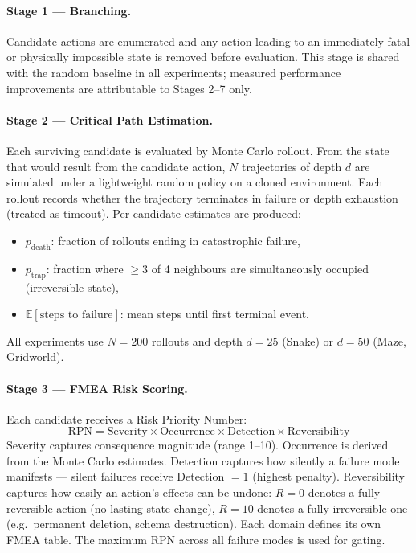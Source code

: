 \documentclass[11pt,letterpaper]{article}
\begin{document}
\paragraph{Stage 1 --- Branching.}
Candidate actions are enumerated and any action leading to an immediately fatal
or physically impossible state is removed before evaluation. This stage is shared
with the random baseline in all experiments; measured performance improvements are
attributable to Stages 2--7 only.

\paragraph{Stage 2 --- Critical Path Estimation.}
Each surviving candidate is evaluated by Monte Carlo rollout. From the state
that would result from the candidate action, $N$ trajectories of depth $d$ are
simulated under a lightweight random policy on a cloned environment. Each
rollout records whether the trajectory terminates in failure or depth exhaustion
(treated as timeout). Per-candidate estimates are produced:
\begin{itemize}[nosep]
  \item $p_{\mathrm{death}}$: fraction of rollouts ending in catastrophic failure,
  \item $p_{\mathrm{trap}}$: fraction where $\geq 3$ of 4 neighbours are
        simultaneously occupied (irreversible state),
  \item $\mathbb{E}[\text{steps to failure}]$: mean steps until first terminal event.
\end{itemize}
All experiments use $N = 200$ rollouts and depth $d = 25$ (Snake) or $d = 50$
(Maze, Gridworld).

\paragraph{Stage 3 --- FMEA Risk Scoring.}
Each candidate receives a Risk Priority Number:
\begin{equation}
  \mathrm{RPN} = \mathrm{Severity} \times \mathrm{Occurrence} \times \mathrm{Detection}
              \times \mathrm{Reversibility}
  \label{eq:rpn}
\end{equation}
Severity captures consequence magnitude (range 1--10). Occurrence is derived from
the Monte Carlo estimates. Detection captures how silently a failure mode manifests
--- silent failures receive Detection $= 1$ (highest penalty). Reversibility
captures how easily an action's effects can be undone: $R = 0$ denotes a fully
reversible action (no lasting state change), $R = 10$ denotes a fully irreversible
one (e.g.\ permanent deletion, schema destruction). Each domain defines
its own FMEA table. The maximum RPN across all failure modes is used for gating.
\end{document}
